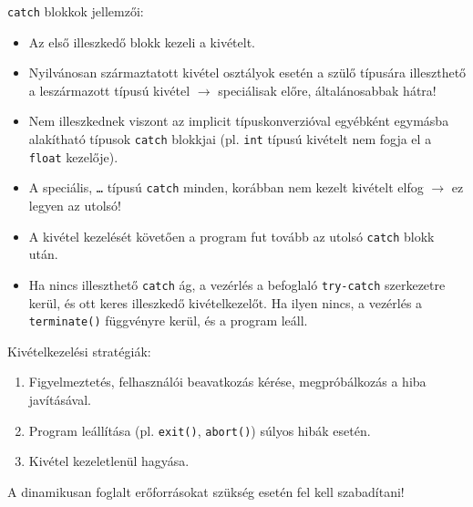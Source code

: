 \documentclass[usenames,dvipsnames,aspectratio=169]{beamer}
\begin{document}
\begin{frame}
    \texttt{catch} blokkok jellemzői:
    \begin{itemize}
        \item Az első illeszkedő blokk kezeli a kivételt.
        \item Nyilvánosan származtatott kivétel osztályok esetén a szülő típusára illeszthető a leszármazott típusú kivétel $\to$ speciálisak előre, általánosabbak hátra!
        \item Nem illeszkednek viszont az implicit típuskonverzióval egyébként egymásba alakítható típusok \texttt{catch} blokkjai (pl. \texttt{int} típusú kivételt nem fogja el a \texttt{float} kezelője).
        \item A speciális, \texttt{\dots} típusú \texttt{catch} minden, korábban nem kezelt kivételt elfog $\to$ ez legyen az utolsó!
        \item A kivétel kezelését követően a program fut tovább az utolsó \texttt{catch} blokk után.
        \item Ha nincs illeszthető \texttt{catch} ág, a vezérlés a befoglaló \texttt{try-catch} szerkezetre kerül, és ott keres illeszkedő kivételkezelőt. Ha ilyen nincs, a vezérlés a \texttt{terminate()} függvényre kerül, és a program leáll.
    \end{itemize}
\end{frame}

\begin{frame}
    Kivételkezelési stratégiák:
    \begin{enumerate}
        \item Figyelmeztetés, felhasználói beavatkozás kérése, megpróbálkozás a hiba javításával.
        \item Program leállítása (pl. \texttt{exit()}, \texttt{abort()}) súlyos hibák esetén.
        \item Kivétel kezeletlenül hagyása.
    \end{enumerate}
    \vfill
    A dinamikusan foglalt erőforrásokat szükség esetén fel kell szabadítani!
\end{frame}

\begin{frame}
    \begin{exampleblock}{}
        
    \end{exampleblock}
\end{frame}
\end{document}
